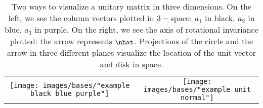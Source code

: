 \begin{table}[ht]
\caption[Two ways to visualize a unitary matrix in three dimensions]{Two ways to visualize a unitary matrix in three dimensions. On the left, we see the column vectors plotted in $3-$space: $a_{1}$ in black, $a_{2}$ in blue, $a_{3}$ in purple. On the right, we see the axis of rotational invariance plotted: the arrow represents $\nhat$. Projections of the circle and the arrow in three different planes visualize the location of the unit vector and disk in space.}
\begin{center}
\begin{tabular}{cc}
%
  \texttt{[image: images/bases/"example black blue purple"]} &
%
  \texttt{[image: images/bases/"example unit normal"]} 
%
\end{tabular}
\end{center}
\label{tab:visual:3d}
\end{table}%

\endinput